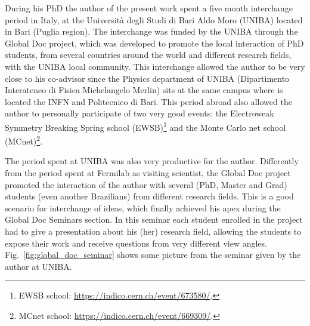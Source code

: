 During his PhD the author of the present work spent a five month interchange period in Italy, at the Università degli Studi di Bari Aldo Moro (UNIBA) located in Bari (Puglia region). The interchange was funded by the UNIBA through the Global Doc project, which was developed to promote the local interaction of PhD students, from several countries around the world and different research fields, with the UNIBA local community. This interchange allowed the author to be very close to his co-advisor since the Physics department of UNIBA (Dipartimento Interateneo di Fisica Michelangelo Merlin) sits at the same campus where is located the INFN and Politecnico di Bari. This period abroad also allowed the author to personally participate of two very good events: the Electroweak Symmetry Breaking Spring school (EWSB)\footnote{EWSB school: \url{https://indico.cern.ch/event/673580/}.} and the Monte Carlo net school (MCnet)\footnote{MCnet school: \url{https://indico.cern.ch/event/669309/}.}.

The period spent at UNIBA was also very productive for the author. Differently from the period spent at Fermilab as visiting scientist, the Global Doc project promoted the interaction of the author with several (PhD, Master and Grad) students (even another Brazilians) from different research fields. This is a good scenario for interchange of ideas, which finally achieved his apex during the Global Doc Seminars section. In this seminar each student enrolled in the project had to give a presentation about his (her) research field, allowing the students to expose their work and receive questions from very different view angles. Fig.~\ref{fig:global_doc_seminar} shows some picture from the seminar given by the author at UNIBA.


